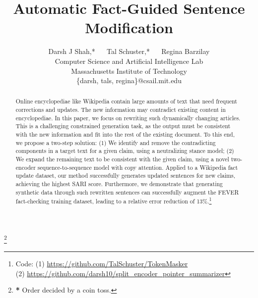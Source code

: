 \documentclass[letterpaper]{article} %
\title{Automatic Fact-Guided Sentence Modification}
\author{Darsh J Shah,* ~~ Tal Schuster,*  ~~ Regina Barzilay\\
  \mbox{}
Computer Science and Artificial Intelligence Lab\\
Massachusetts Institute of Technology \\
\{darsh, tals, regina\}@csail.mit.edu
}
\begin{document}
\maketitle
\let\svthefootnote\thefootnote
\let\thefootnote\relax\footnote{\textbf{*} Order decided by a coin toss.}
\addtocounter{footnote}{-1}
\let\thefootnote\svthefootnote
\begin{abstract}
Online encyclopediae like Wikipedia contain large amounts of text that need frequent corrections and updates. The new information may contradict existing content in encyclopediae. In this paper, we focus on rewriting such dynamically changing articles. This is a challenging constrained generation task, as the output must be consistent with the new information and fit into the rest of the existing document. To this end, we propose a two-step solution: (1) We identify and remove the contradicting components in a target text for a given claim, using a neutralizing stance model; (2) We expand the remaining text to be consistent with the given claim, using a novel two-encoder sequence-to-sequence model with copy attention. Applied to a Wikipedia fact update dataset, our method successfully generates updated sentences for new claims, achieving the highest SARI score. Furthermore, we demonstrate that generating synthetic data through such rewritten sentences can successfully augment the FEVER fact-checking training dataset, leading to a relative error reduction of 13\%.\footnote{ Code: (1) \url{https://github.com/TalSchuster/TokenMasker}\\ (2) \url{https://github.com/darsh10/split_encoder_pointer_summarizer}}



\end{abstract}
\end{document}
